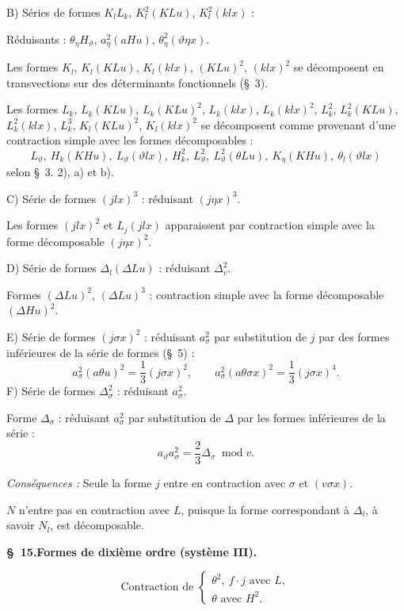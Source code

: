 \documentclass[11pt]{article}
\newcommand{\A}{\Delta}
\newcommand{\modu}[1]{\;\operatorname{mod} #1}
\providecommand{\modu}[1]{\;\operatorname{mod} #1}
\begin{document}
B) Séries de formes $K_lL_k$, $K_l^2(KLu)$, $K_l^2(klx)$ :

Réduisants : $\theta_\eta H_\vartheta$, $a_\eta^2(aHu)$, $\theta_\eta^2(\vartheta\eta x)$.

Les formes $K_l$, $K_l(KLu)$, $K_l(klx)$, $(KLu)^2$, $(klx)^2$ se décomposent en transvections sur des déterminants fonctionnels (\S\ 3).

Les formes $L_k$, $L_k(KLu)$, $L_k(KLu)^2$, $L_k(klx)$, $L_k(klx)^2$, $L_k^2$, $L_k^2(KLu)$, $L_k^2(klx)$, $L_k^3$, $K_l(KLu)^2$, $K_l(klx)^2$ se décomposent comme provenant d'une contraction simple avec les formes décomposables :
\[
L_\vartheta,
\ H_k(KHu),
\ L_\vartheta(\vartheta lx),
\ H_k^2,
\ L_\vartheta^2,
\ L_\vartheta^2(\theta Lu),
\ K_\eta(KHu),
\ \theta_l(\vartheta lx)
\]
selon \S\ 3. 2), a) et b).

C) Série de formes $(jlx)^3$ : réduisant $(j\eta x)^3$.

Les formes $(jlx)^2$ et $L_j(jlx)$ apparaissent par contraction simple avec la forme décomposable $(j\eta x)^2$.

D) Série de formes $\A_l(\A Lu)$ : réduisant $\A_v^2$.

Formes $(\A Lu)^2$, $(\A Lu)^3$ : contraction simple avec la forme décomposable $(\A Hu)^2$.

E) Série de formes $(j\sigma x)^2$ : réduisant $a_\sigma^2$ par substitution de $j$ par des formes inférieures de la série de formes (\S\ 5) :
\[
a_\sigma^2(a\theta u)^2=\frac13(j\sigma x)^2,
\qquad
 a_\sigma^2(a\theta\sigma x)^2=\frac13(j\sigma x)^4.
\]
F) Série de formes $\A_\sigma^2$ : réduisant $a_\sigma^2$.

Forme $\A_\sigma$ : réduisant $a_\sigma^2$ par substitution de $\A$ par les formes inférieures de la série :
\[
a_\vartheta a_\sigma^2=\frac23\A_\sigma\modu{v}.
\]

\noindent\emph{Conséquences :} Seule la forme $j$ entre en contraction avec $\sigma$ et $(v\sigma x)$.

$N$ n'entre pas en contraction avec $L$, puisque la forme correspondant à $\A_l$, à savoir $N_l$, est décomposable.

\begin{center}
\textbf{\S\ 15.\quad Formes de dixième ordre (système III).}
\end{center}
\[
\text{Contraction de }\left\{\begin{array}{l}
\theta^2,
\ f\cdot j\text{ avec }L,\\
\theta\text{ avec }H^2.
\end{array}\right.
\]
\end{document}
